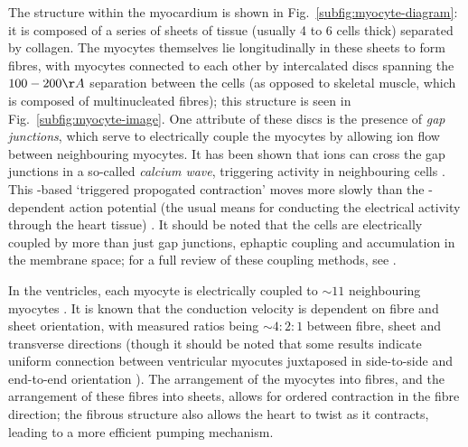 \documentclass[../thesis-main.tex]{subfiles}
\begin{document}
The structure within the myocardium is shown in Fig.~\ref{subfig:myocyte-diagram}: it is composed of a series of sheets of tissue (usually 4 to 6 cells thick) separated by collagen. The myocytes themselves lie longitudinally in these sheets to form fibres, with myocytes connected to each other by intercalated discs spanning the $100-200\AA$ separation between the cells (as opposed to skeletal muscle, which is composed of multinucleated fibres); this structure is seen in Fig.~\ref{subfig:myocyte-image}. One attribute of these discs is the presence of \emph{gap junctions}, which serve to electrically couple the myocytes by allowing ion flow between neighbouring myocytes. It has been shown that \ca{} ions can cross the gap junctions in a so-called \emph{calcium wave}, triggering activity in neighbouring cells \citep{Miura1998}. This \ca{}-based `triggered propogated contraction' moves more slowly than the \na{}-dependent action potential (the usual means for conducting the electrical activity through the heart tissue) \citep{Clusin2003}. It should be noted that the cells are electrically coupled by more than just gap junctions, \eg{} ephaptic coupling and \K{} accumulation in the membrane space; for a full review of these coupling methods, see \citet{Sperelakis2002}.

In the ventricles, each myocyte is electrically coupled to $\sim11$ neighbouring myocytes \citep{Smaill2013}. It is known that the conduction velocity is dependent on fibre and sheet orientation, with measured ratios being $\sim4:2:1$ between fibre, sheet and transverse directions \citep{Caldwell2009} (though it should be noted that some results indicate uniform connection between ventricular myocutes juxtaposed in side-to-side and end-to-end orientation \citep{Saffitz1994}). The arrangement of the myocytes into fibres, and the arrangement of these fibres into sheets, allows for ordered contraction in the fibre direction; the fibrous structure also allows the heart to twist as it contracts, leading to a more efficient pumping mechanism.
\end{document}
